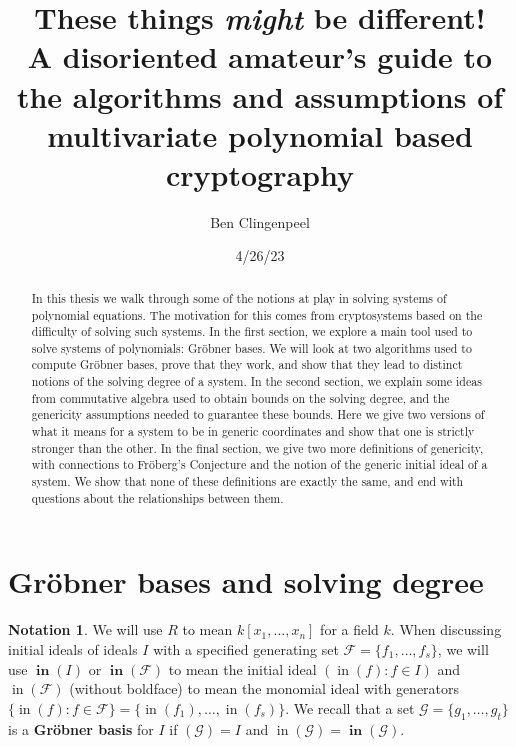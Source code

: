 \documentclass[11pt]{article}
\title{\Huge \textbf{These things \emph{might} be different!} \\ \Large A disoriented amateur's guide to the algorithms and assumptions of multivariate polynomial based cryptography}
\author{Ben Clingenpeel}
\date{\vspace{-.8em} 4/26/23}
\newcommand{\F}{\mathcal{F}}
\DeclareMathOperator{\init}{in}
\DeclareMathOperator{\Init}{\mathbf{in}}
\theoremstyle{definition}
\newtheorem*{notation}{Notation}
\begin{document}
\maketitle



\begin{abstract}
	\vspace{-1em}
	\noindent In this thesis we walk through some of the notions at play in solving systems of polynomial equations. The motivation for this comes from cryptosystems based on the difficulty of solving such systems. In the first section, we explore a main tool used to solve systems of polynomials: Gröbner bases. We will look at two algorithms used to compute Gröbner bases, prove that they work, and show that they lead to distinct notions of the solving degree of a system. In the second section, we explain some ideas from commutative algebra used to obtain bounds on the solving degree, and the genericity assumptions needed to guarantee these bounds. Here we give two versions of what it means for a system to be in generic coordinates and show that one is strictly stronger than the other. In the final section, we give two more definitions of genericity, with connections to Fröberg's Conjecture and the notion of the generic initial ideal of a system. We show that none of these definitions are exactly the same, and end with questions about the relationships between them. 
\end{abstract}

\section{Gröbner bases and solving degree}

\begin{notation}
	We will use $R$ to mean $k[x_1, \dots, x_n]$ for a field $k$. When discussing initial ideals of ideals $I$ with a specified generating set $\F = \{f_1, \dots, f_s\}$, we will use $\Init(I)$ or $\Init(\F)$ to mean the initial ideal $(\init(f): f \in I)$ and $\init(\F)$ (without boldface) to mean the monomial ideal with generators $\{\init(f): f \in \F\} = \{\init(f_1), \dots, \init(f_s)\}$. We recall that a set $\mathcal{G} = \{g_1, \dots, g_t\}$ is a \textbf{Gröbner basis} for $I$ if $(\mathcal{G}) = I$ and $\init(\mathcal{G}) = \Init(\mathcal{G})$.
\end{notation}
\end{document}
